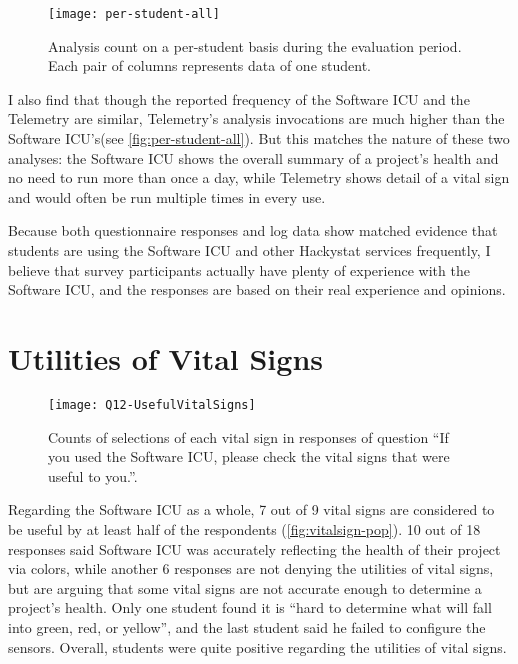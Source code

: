 \begin{figure}[htbp] %
   \centering
   \texttt{[image: per-student-all]} 
   \caption[Analysis count on a per-student basis]{Analysis count on a per-student basis during the evaluation period. Each pair of columns represents data of one student.}
   \label{fig:per-student-all}
\end{figure}

I also find that though the reported frequency of the Software ICU and the Telemetry are similar, Telemetry's analysis invocations are much higher than the Software ICU's(see \autoref{fig:per-student-all}). But this matches the nature of these two analyses: the Software ICU shows the overall summary of a project's health and no need to run more than once a day, while Telemetry shows detail of a vital sign and would often be run multiple times in every use. 

Because both questionnaire responses and log data show matched evidence that students are using the Software ICU and other Hackystat services frequently, I believe that survey participants actually have plenty of experience with the Software ICU, and the responses are based on their real experience and opinions. 

\section{Utilities of Vital Signs}

\begin{figure}[htbp] %
   \centering
   \texttt{[image: Q12-UsefulVitalSigns]} 
   \caption[Vital sign popularity from survey]{Counts of selections of each vital sign in responses of question ``If you used the Software ICU, please check the vital signs that were useful to you.''.}
   \label{fig:vitalsign-pop}
\end{figure}

Regarding the Software ICU as a whole, 7 out of 9 vital signs are considered to be useful by at least half of the respondents (\autoref{fig:vitalsign-pop}). 10 out of 18 responses said Software ICU was accurately reflecting the health of their project via colors, while another 6 responses are not denying the utilities of vital signs, but are arguing that some vital signs are not accurate enough to determine a project's health. Only one student found it is ``hard to determine what will fall into green, red, or yellow'', and the last student said he failed to configure the sensors. Overall, students were quite positive regarding the utilities of vital signs.

